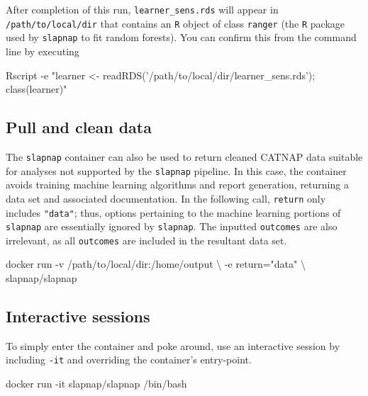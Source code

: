 \documentclass[]{article}
\newenvironment{Shaded}{\begin{snugshade}}{\end{snugshade}}
\newcommand{\StringTok}[1]{\textcolor[rgb]{0.31,0.60,0.02}{#1}}
\newcommand{\ExtensionTok}[1]{#1}
\newcommand{\NormalTok}[1]{#1}
\begin{document}
After completion of this run, \texttt{learner\_sens.rds} will appear in
\texttt{/path/to/local/dir} that contains an \texttt{R} object of class
\texttt{ranger} (the \texttt{R} package used by \texttt{slapnap} to fit
random forests). You can confirm this from the command line by executing

\begin{Shaded}
\begin{Highlighting}[]
\ExtensionTok{Rscript}\NormalTok{ -e }\StringTok{"learner <- readRDS('/path/to/local/dir/learner_sens.rds'); class(learner)"}
\end{Highlighting}
\end{Shaded}

\subsection{Pull and clean data}\label{pull-and-clean-data}

The \texttt{slapnap} container can also be used to return cleaned CATNAP
data suitable for analyses not supported by the \texttt{slapnap}
pipeline. In this case, the container avoids training machine learning
algorithms and report generation, returning a data set and associated
documentation. In the following call, \texttt{return} only includes
\texttt{"data"}; thus, options pertaining to the machine learning
portions of \texttt{slapnap} are essentially ignored by
\texttt{slapnap}. The inputted \texttt{outcomes} are also irrelevant, as
all \texttt{outcomes} are included in the resultant data set.

\begin{Shaded}
\begin{Highlighting}[]
\ExtensionTok{docker}\NormalTok{ run -v /path/to/local/dir:/home/output \textbackslash{}}
\NormalTok{           -e return=}\StringTok{"data"}\NormalTok{ \textbackslash{}}
\NormalTok{           slapnap/slapnap}
\end{Highlighting}
\end{Shaded}

\subsection{Interactive sessions}\label{interactive-sessions}

To simply enter the container and poke around, use an interactive
session by including \texttt{-it} and overriding the container's
entry-point.

\begin{Shaded}
\begin{Highlighting}[]
\ExtensionTok{docker}\NormalTok{ run -it slapnap/slapnap /bin/bash}
\end{Highlighting}
\end{Shaded}
\end{document}
